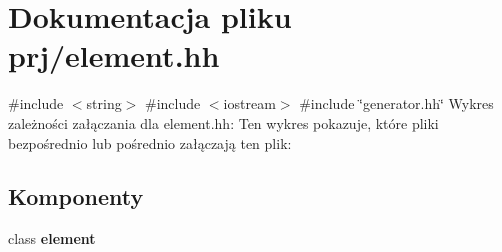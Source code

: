 \section{\-Dokumentacja pliku prj/element.hh}
\label{element_8hh}
{\ttfamily \#include $<$string$>$}\*
{\ttfamily \#include $<$iostream$>$}\*
{\ttfamily \#include \char`\"{}generator.\-hh\char`\"{}}\*
\-Wykres zależności załączania dla element.\-hh\-:
\-Ten wykres pokazuje, które pliki bezpośrednio lub pośrednio załączają ten plik\-:
\subsection*{\-Komponenty}
\begin{DoxyCompactItemize}
\item 
class {\bf element}
\end{DoxyCompactItemize}
